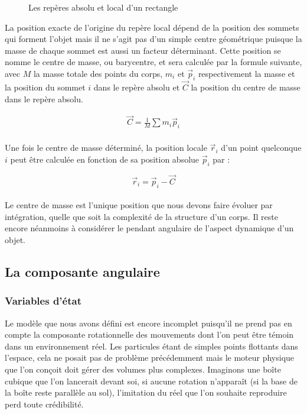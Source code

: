 \begin{figure}
  \centering
  
  \caption{Les repères absolu et local d'un rectangle}
  \label{reperelocal}
\end{figure}

La position exacte de l'origine du repère local dépend de la position
des sommets qui forment l'objet mais il ne s'agit pas d'un simple
centre géométrique puisque la masse de chaque sommet est aussi un
facteur déterminant. Cette position se nomme le centre de masse, ou
barycentre, et sera calculée par la formule suivante, avec $M$ la
masse totale des points du corps, $m_i$ et $\vec{p}_i$ respectivement
la masse et la position du sommet $i$ dans le repère absolu et
$\vec{C}$ la position du centre de masse dans le repère absolu.

\begin{align*}
  \vec{C} = \frac{1}{M} \sum m_i \vec{p}_i \\
\end{align*}

Une fois le centre de masse déterminé, la position locale $\vec{r}_i$
d'un point quelconque $i$ peut être calculée en fonction de sa
position absolue $\vec{p}_i$ par :

\[\vec{r}_i = \vec{p}_i - \vec{C}\] \\

Le centre de masse est l'unique position que nous devons faire évoluer
par intégration, quelle que soit la complexité de la structure d'un
corps. Il reste encore néanmoins à considérer le pendant angulaire de
l'aspect dynamique d'un objet.

\subsection{La composante angulaire}

\subsubsection{Variables d'état}

Le modèle que nous avons défini est encore incomplet puisqu'il ne
prend pas en compte la composante rotationnelle des mouvements dont
l'on peut être témoin dans un environnement réel. Les particules étant
de simples points flottants dans l'espace, cela ne posait pas de
problème précédemment mais le moteur physique que l'on conçoit doit
gérer des volumes plus complexes. Imaginons une boîte cubique que l'on
lancerait devant soi, si aucune rotation n'apparaît (si la base de la
boîte reste parallèle au sol), l'imitation du réel que l'on souhaite
reproduire perd toute crédibilité.

